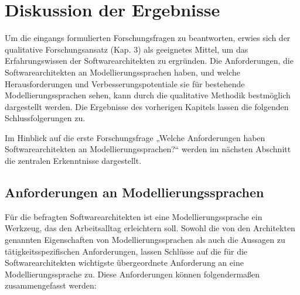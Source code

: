 

\lstset{language=C}




\chapter{Diskussion der Ergebnisse}

Um die eingangs formulierten Forschungsfragen zu beantworten, erwies sich der qualitative Forschungsansatz (Kap. 3) als geeignetes Mittel, um das Erfahrungswissen der Softwarearchitekten zu ergründen. Die Anforderungen, die Softwarearchitekten an Modellierungssprachen haben, und welche Herausforderungen und Verbesserungspotentiale sie für bestehende Modellierungssprachen sehen, kann durch die qualitative Methodik bestmöglich dargestellt werden. Die Ergebnisse des vorherigen Kapitels lassen die folgenden Schlussfolgerungen zu.

Im Hinblick auf die erste Forschungsfrage „Welche Anforderungen haben Softwarearchitekten an Modellierungssprachen?“  werden im nächsten Abschnitt die zentralen Erkenntnisse dargestellt.



\section{Anforderungen an Modellierungssprachen}

Für die befragten Softwarearchitekten ist eine Modellierungssprache ein Werkzeug, das den Arbeitsalltag erleichtern soll. Sowohl die von den Architekten genannten Eigenschaften von Modellierungssprachen als auch die Aussagen zu tätigkeitsspezifischen Anforderungen, lassen Schlüsse auf die für die Softwarearchitekten wichtigste übergeordnete Anforderung an eine Modellierungssprache zu. Diese Anforderungen können folgendermaßen zusammengefasst werden:

